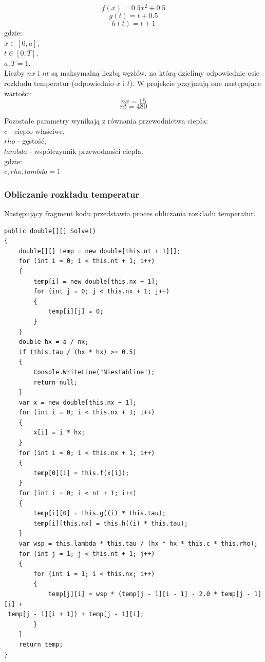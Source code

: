 \documentclass[twoside]{projektInzynierskiMS1}
\newcommand{\si}{ś}
\begin{document}
\[ f(x) = 0.5 x^2 + 0.5 \] 
\[ g(t) = t + 0.5 \] 
\[ h(t) = t + 1 \] 
\noindent gdzie: \\
$ x \in [0, a] $, \\
$ t \in [0, T] $, \\
$ a, T = 1$. \\

Liczby $nx$ i $nt$ są maksymalną liczbą węzłów, na którą dzielimy odpowiednie osie rozkładu temperatur (odpowiednio $x$ i $t$). W projekcie przyjmują one następujące warto\si ci: 
\[ nx = 15 \]
\[nt = 480 \]

Pozostałe parametry wynikają z równania przewodnictwa ciepła: \\
$c$ - ciepło wła\si ciwe,\\
$rho$ - gęsto\si ć,\\
$lambda$ - współczynnik przewodno\si ci ciepła.\\

\noindent  gdzie: \\
$ c, rho, lambda = 1 $

\subsubsection{Obliczanie rozkładu temperatur}
Następujący fragment kodu przedstawia proces obliczania rozkładu temperatur.

\begin{verbatim}
public double[][] Solve()
{
    double[][] temp = new double[this.nt + 1][];
    for (int i = 0; i < this.nt + 1; i++)
    {
        temp[i] = new double[this.nx + 1];
        for (int j = 0; j < this.nx + 1; j++)
        {
            temp[i][j] = 0;
        }
    }
    double hx = a / nx;
    if (this.tau / (hx * hx) >= 0.5)
    {
        Console.WriteLine("Niestabline");
        return null;
    }
    var x = new double[this.nx + 1];
    for (int i = 0; i < this.nx + 1; i++)
    {
        x[i] = i * hx;
    }
    for (int i = 0; i < this.nx + 1; i++)
    {
        temp[0][i] = this.f(x[i]);
    }
    for (int i = 0; i < nt + 1; i++)
    {
        temp[i][0] = this.g((i) * this.tau);
        temp[i][this.nx] = this.h((i) * this.tau);
    }
    var wsp = this.lambda * this.tau / (hx * hx * this.c * this.rho);
    for (int j = 1; j < this.nt + 1; j++)
    {
        for (int i = 1; i < this.nx; i++)
        {
            temp[j][i] = wsp * (temp[j - 1][i - 1] - 2.0 * temp[j - 1][i] +
 temp[j - 1][i + 1]) + temp[j - 1][i];
        }
    }
    return temp;
}   
\end{verbatim}
\end{document}
